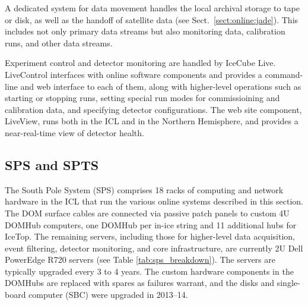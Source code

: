 A dedicated system for data movement handles the local archival storage to
tape or disk, as well as the handoff of satellite data (see Sect.~\ref{sect:online:jade}).
This includes not only primary data streams but also monitoring data,
calibration runs, and other data streams.

Experiment control and detector monitoring are handled by IceCube Live.
LiveControl interfaces with online software components and provides a
command-line and web interface to each of them, along with higher-level
operations such as starting or stopping runs, setting special run modes for
commissioining and calibration data, and specifying detector
configurations.  The web site component, LiveView, runs both in the ICL and
in the Northern Hemisphere, and provides a near-real-time view of detector
health.  



\subsection{\label{sect:sps}SPS and SPTS}

The South Pole System (SPS) comprises 18 racks of computing and
network hardware in the ICL that run the various online systems described in this
section.  The DOM surface cables are connected via passive patch panels to
custom 4U DOMHub computers, one DOMHub per in-ice string and 11 additional
hubs for IceTop.  The remaining servers, including those for higher-level
data acquisition, event filtering, detector monitoring, and core
infrastructure, are currently 2U Dell PowerEdge R720 servers (see Table
\ref{tab:sps_breakdown}).  The servers are typically upgraded every 3 to 4
years.  The custom hardware components in the DOMHubs are replaced with spares as
failures warrant, and the disks and single-board computer (SBC) were
upgraded in 2013--14.

